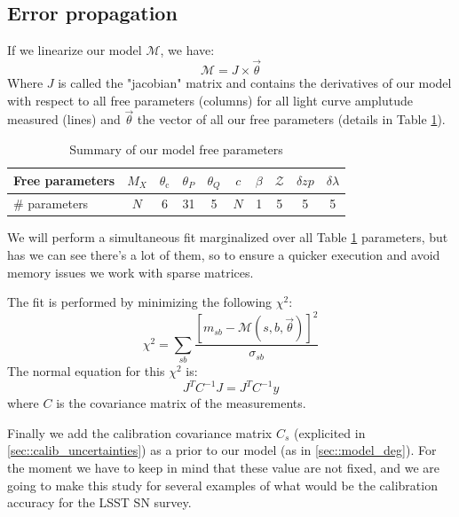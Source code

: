 \documentclass[\docopts]{\docclass}
\begin{document}

\subsection{Error propagation}
\label{sec::linalg}

If we linearize our model $\mathcal{M}$, we have:
\begin{equation}
\mathcal{M} = J \times \vec\theta
\end{equation}
Where $J$ is called the "jacobian" matrix and contains the derivatives of our model with respect to all free parameters (columns) for all light curve amplutude measured (lines) and $\vec\theta$ the vector of all our free parameters (details in Table \ref{tab:params}).

\begin{table}[t]
\begin{center}
\label{tab:params}
\caption{Summary of our model free parameters}
\begin{tabular}{l|ccccccccc}
\hline
\hline
Free parameters & $M_X$ & $\theta_\text{c}$ & $\theta_P$ & $\theta_Q$ & $c$ & $\beta$ & $\mathcal{Z}$ & $\delta zp$ & $\delta \lambda$ \\
\hline
\# parameters & $N$ & 6 & 31 & 5 & $N$ & 1 & 5 & 5 & 5 \\
\hline
\end{tabular}
\end{center}
\end{table}


We will perform a simultaneous fit marginalized over all Table \ref{tab:params} parameters, but has we can see there's a lot of them, so to ensure a quicker execution and avoid memory issues we work with sparse matrices.

The fit is performed by minimizing the following $\chi^2$:
\begin{equation}
\chi^2 = \sum_{sb}\frac{[m_{sb} - \mathcal{M}(s, b, \vec\theta)]^2}{\sigma_{sb}}
\end{equation}
The normal equation for this $\chi^2$ is:
\begin{equation}
J^TC^{-1}J = J^TC^{-1}y
\end{equation}
where $C$ is the covariance matrix of the measurements.

Finally we add the calibration covariance matrix $C_s$ (explicited in \ref{sec::calib_uncertainties}) as a prior to our model (as in \ref{sec::model_deg}).
For the moment we have to keep in mind that these value are not fixed, and we are going to make this study for several examples of what would be the calibration accuracy for the LSST SN survey.
\end{document}
